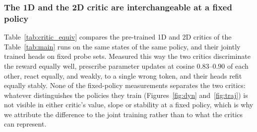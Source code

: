 \subsubsection{The 1D and the 2D critic are interchangeable at a fixed policy}
\label{app:critic_equiv}
Table~\ref{tab:critic_equiv} compares the pre-trained 1D and 2D critics of the Table~\ref{tab:main} runs on the same states of the same policy, and their jointly trained heads on fixed probe sets. Measured this way the two critics discriminate the reward equally well, prescribe parameter updates at cosine $0.83$--$0.90$ of each other, react equally, and weakly, to a single wrong token, and their heads refit equally stably. None of the fixed-policy measurements separates the two critics: whatever distinguishes the policies they train (Figures~\ref{fig:dyn} and~\ref{fig:traj}) is not visible in either critic's value, slope or stability at a fixed policy, which is why we attribute the difference to the joint training rather than to what the critics can represent.

